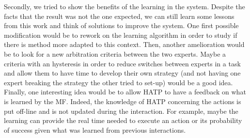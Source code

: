 \documentclass[english,a4paper,11pt,twoside]{StyleThese}
\begin{document}
Secondly, we tried to show the benefits of the learning in the system. Despite the facts that the result was not the one expected, we can still learn some lessons from this work and think of solutions to improve the system. One first possible modification would be to rework on the learning algorithm in order to study if there is method more adapted to this context. Then, another amelioration would be to look for a new arbitration criteria between the two experts. Maybe a criteria with an hysteresis in order to reduce switches between experts in a task and allow them to have time to develop their own strategy (and not having one expert breaking the strategy the other tried to set-up) would be a good idea. Finally, one interesting idea would be to allow HATP to have a feedback on what is learned by the MF. Indeed, the knowledge of HATP concerning the actions is put off-line and is not updated during the interaction. For example, maybe the learning can provide the real time needed to execute an action or its probability of success given what was learned from previous interactions.


\ifdefined{}
\else


\end{document}
